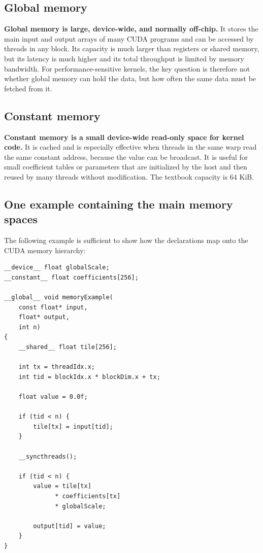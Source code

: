 \documentclass[11pt,a4paper]{article}
\begin{document}
\subsection{Global memory}

\textbf{Global memory is large, device-wide, and normally off-chip.} It stores the main input and output arrays of many CUDA programs and can be accessed by threads in any block. Its capacity is much larger than registers or shared memory, but its latency is much higher and its total throughput is limited by memory bandwidth. For performance-sensitive kernels, the key question is therefore not whether global memory can hold the data, but how often the same data must be fetched from it.

\subsection{Constant memory}

\textbf{Constant memory is a small device-wide read-only space for kernel code.} It is cached and is especially effective when threads in the same warp read the same constant address, because the value can be broadcast. It is useful for small coefficient tables or parameters that are initialized by the host and then reused by many threads without modification. The textbook capacity is $64$ KiB.

\subsection{One example containing the main memory spaces}

The following example is sufficient to show how the declarations map onto the CUDA memory hierarchy:

\begin{lstlisting}
__device__ float globalScale;
__constant__ float coefficients[256];

__global__ void memoryExample(
    const float* input,
    float* output,
    int n)
{
    __shared__ float tile[256];

    int tx = threadIdx.x;
    int tid = blockIdx.x * blockDim.x + tx;

    float value = 0.0f;

    if (tid < n) {
        tile[tx] = input[tid];
    }

    __syncthreads();

    if (tid < n) {
        value = tile[tx]
              * coefficients[tx]
              * globalScale;

        output[tid] = value;
    }
}
\end{lstlisting}
\end{document}
